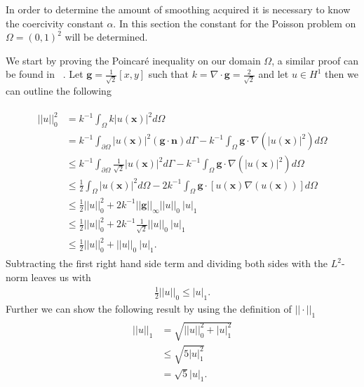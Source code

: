 In order to determine the amount of smoothing acquired it is necessary to know the coercivity constant $\alpha$. In this section the constant for the Poisson problem on $\Omega = (0,1)^2$ will be determined.

We start by proving the Poincar\'e inequality on our domain $ \Omega $, a similar proof can be found in ~\cite{Quarteroni}. Let $\mathbf{g} = \frac{1}{\sqrt{2}}[x,y]$ such that $k = \nabla \cdot \mathbf{g}=\frac{2}{\sqrt{2}}$ and let $u \in H^1$ then we can outline the following

\begin{align}
	\begin{split}
	||u||_0^2 &= k^{-1}\int_{\Omega}k|u(\mathbf{x})|^2d\Omega \\
	&=  k^{-1}\int_{\partial \Omega}|u(\mathbf{x})|^2(\mathbf{g}\cdot \mathbf{n})d\Gamma 
	-k^{-1}\int_{\Omega}\mathbf{g}\cdot \nabla(|u(\mathbf{x})|^2)d\Omega \\
	&\leq  k^{-1}\int_{\partial \Omega}\frac{1}{\sqrt{2}}|u(\mathbf{x})|^2d\Gamma 
	-k^{-1}\int_{\Omega}\mathbf{g}\cdot \nabla(|u(\mathbf{x})|^2)d\Omega \\
	&\leq \frac{1}{2} \int_{\Omega}|u(\mathbf{x})|^2d\Omega
	-2k^{-1}\int_{\Omega}\mathbf{g}\cdot [u(\mathbf{x})\nabla(u(\mathbf{x}))]d\Omega \\
	&\leq \frac{1}{2}||u||_0^2 + 2k^{-1}||\mathbf{g}||_{\infty}||u||_0 \: |u|_1\\
	&\leq \frac{1}{2}||u||_0^2 + 2k^{-1}\frac{1}{\sqrt{2}}||u||_0 \: |u|_1\\
	&\leq \frac{1}{2}||u||_0^2 + ||u||_0 \: |u|_1.
	\end{split}
	\label{eq:PoincareProof}
\end{align}
Subtracting the first right hand side term and dividing both sides with the $L^2$-norm leaves us with
\begin{align}
	\frac{1}{2}||u||_0 \leq |u|_1.
	\label{eq:PoincareStatement}
\end{align}
Further we can show the following result by using the definition of $||\cdot||_1$
\begin{align}
	\begin{split}
	||u||_1 &= \sqrt{||u||_0^2+|u|_1^2}\\
	&	\leq \sqrt{5|u|_1^2}\\
	&= \sqrt{5}|u|_1.
	\end{split}
	\label{eq:NormInequalitySobolev}
\end{align}

